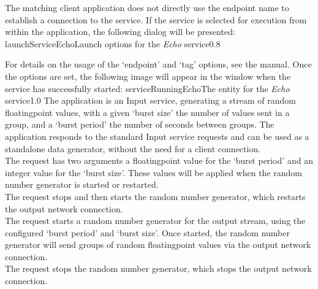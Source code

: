 \insertAutoAppParameters
{}
The matching client application does not directly use the endpoint name to establish a
connection to the service.
\condPage
If the service is selected for execution from within the \emph{\CMU} application, the
following dialog will be presented:
%
{launchServiceEcho}{Launch options for the \emph{Echo} service}{0.8}

For details on the usage of the `endpoint' and `tag' options, see the \emph{\CMU} manual.
Once the options are set, the following image will appear in the \emph{\CMU} window when
the service has successfully started:
%
{serviceRunningEcho}{The \emph{\CMU} entity for the \emph{Echo} service}{1.0}
The  application is an Input service,
generating a stream of random floating\longDash{}point values, with a given `burst size'
\longDash{} the number of values sent in a group, and a `burst period' \longDash{} the
number of seconds between groups.
The application responds to the standard Input service requests and can be used as a
standalone data generator, without the need for a client connection.\\

The  request has two arguments
\longDash{} a floating\longDash{}point value for the `burst period' and an integer value
for the `burst size'.
These values will be applied when the random number generator is started or restarted.\\

The  request stops and then
starts the random number generator, which restarts the output \yarp{} network
connection.\\

The  request starts a random
number generator for the output stream, using the configured `burst period' and
`burst size'.
Once started, the random number generator will send groups of random
floating\longDash{}point values via the output \yarp{} network connection.\\

The  request stops the random
number generator, which stops the output \yarp{} network connection.\\ 

